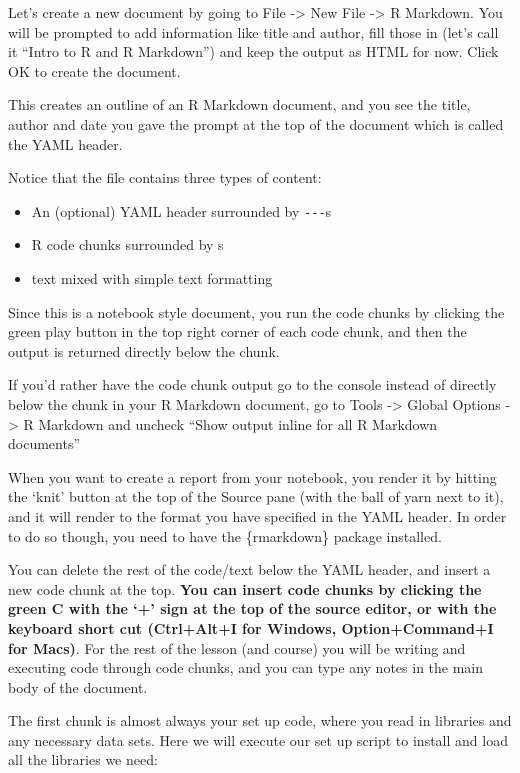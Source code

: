 \documentclass[
]{book}
\begin{document}
Let's create a new document by going to File -\textgreater{} New File -\textgreater{} R Markdown. You will be prompted to add information like title and author, fill those in (let's call it ``Intro to R and R Markdown'') and keep the output as HTML for now. Click OK to create the document.

This creates an outline of an R Markdown document, and you see the title, author and date you gave the prompt at the top of the document which is called the YAML header.

Notice that the file contains three types of content:

\begin{itemize}
\item
  An (optional) YAML header surrounded by \texttt{-\/-\/-}s
\item
  R code chunks surrounded by \texttt{\textasciigrave{}\textasciigrave{}\textasciigrave{}}s
\item
  text mixed with simple text formatting
\end{itemize}

Since this is a notebook style document, you run the code chunks by clicking the green play button in the top right corner of each code chunk, and then the output is returned directly below the chunk.

If you'd rather have the code chunk output go to the console instead of directly below the chunk in your R Markdown document, go to Tools -\textgreater{} Global Options -\textgreater{} R Markdown and uncheck ``Show output inline for all R Markdown documents''

When you want to create a report from your notebook, you render it by hitting the `knit' button at the top of the Source pane (with the ball of yarn next to it), and it will render to the format you have specified in the YAML header. In order to do so though, you need to have the \{rmarkdown\} package installed.

You can delete the rest of the code/text below the YAML header, and insert a new code chunk at the top. \textbf{You can insert code chunks by clicking the green C with the `+' sign at the top of the source editor, or with the keyboard short cut (Ctrl+Alt+I for Windows, Option+Command+I for Macs)}. For the rest of the lesson (and course) you will be writing and executing code through code chunks, and you can type any notes in the main body of the document.

The first chunk is almost always your set up code, where you read in libraries and any necessary data sets. Here we will execute our set up script to install and load all the libraries we need:
\end{document}
